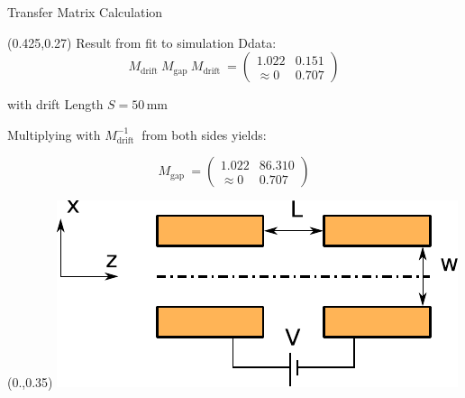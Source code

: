 \documentclass[10pt,aspectratio=169]{beamer}
\begin{document}
\begin{frame}{Transfer Matrix Calculation}
    \begin{textblock*}{0.5\paperwidth}(0.425\paperwidth,0.27\paperheight)
        \centering
        Result from fit to simulation Ddata:
        \begin{equation*}
            M_\text{drift  } M_\text{gap  } M_\text{drift  } = \begin{pmatrix} 1.022 & 0.151 \\ \approx 0 & 0.707 \end{pmatrix}
        \end{equation*}

        with drift Length $S=50$\,mm

         \vspace{0.1\paperheight}
        
        Multiplying with $M_\text{drift  }^{-1}$ from both sides yields: 

        \begin{equation*}
            M_\text{gap  } = \begin{pmatrix} 1.022 & 86.310  \\ \approx 0 & 0.707 \end{pmatrix}
        \end{equation*}

            
    \end{textblock*}
    \begin{textblock*}{0.5\paperwidth}(0.\paperwidth,0.35\paperheight)
		\centering
		\includegraphics[width=.8\textwidth]{Exercises_presentation/images/ibs_logo.pdf}
	\end{textblock*}
  

\end{frame}
\end{document}
